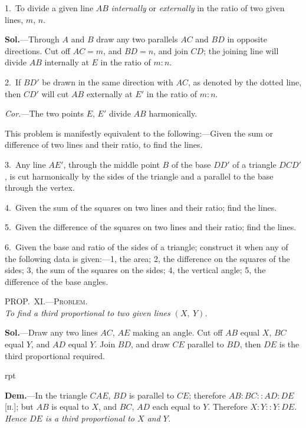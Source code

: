 \documentclass[oneside]{book}
\newcounter{wrapwidth}
\newcommand\myprop[2]{
\bigskip\Needspace*{4\baselineskip}\begin{center}\textsc{#1}\\\medskip\emph{#2}\par\end{center}
}
\newcommand\imgflow[3]{
\setcounter{wrapwidth}{#1}

\begin{wrapfigure}[#2]{r}{\value{wrapwidth}pt}
\begin{center}
\vspace{-0.3in}

\end{center}
\end{wrapfigure}
}
\newcommand\imgcent[2]{
\begin{center}

\end{center}
}
\begin{document}
\begin{footnotesize}
1.~To divide a given line $AB$ \emph{internally} or \emph{externally} in the
ratio of two given lines, $m$, $n$.



\imgcent{250}{f179}

\textbf{Sol.}---Through $A$ and $B$ draw any two parallels $AC$ and $BD$ in
opposite directions. Cut off $AC = m$, and $BD = n$, and join
$CD$; the joining line will divide $AB$ internally at $E$ in the ratio
of $m : n$.

2.~If $BD'$ be drawn in the same direction with $AC$, as denoted
by the dotted line, then $CD'$ will cut $AB$ externally at $E'$ in the
ratio of $m : n$.

\emph{Cor.}---The two points $E$, $E'$ divide $AB$ harmonically.

This problem is manifestly equivalent to the following:---Given
the sum or difference of two lines and their ratio, to find
the lines.

3.~Any line $AE'$, through the middle point $B$ of the base $DD'$
of a triangle $DCD'$, is cut harmonically by the sides of the
triangle and a parallel to the base through the vertex.

4.~Given the sum of the squares on two lines and their ratio;
find the lines.

5.~Given the difference of the squares on two lines and their
ratio; find the lines.

6.~Given the base and ratio of the sides of a triangle; construct
it when any of the following data is given:---1, the area;
2, the difference on the squares of the sides; 3, the sum of the
squares on the sides; 4, the vertical angle; 5, the difference of
the base angles.
\par\end{footnotesize}

\myprop{PROP\@.~XI\@.---Problem.}{To find a third proportional\index{Proportionals!third} to two given lines $(X,\ Y)$.}

\textbf{Sol.}---Draw any two lines $AC$, $AE$ making an angle.
Cut off $AB$ equal $X$, $BC$ equal $Y$, and $AD$ equal $Y$.
Join $BD$, and draw $CE$ parallel to $BD$, then $DE$ is the
third proportional required.




\imgflow{175}{7}{f180}

\textbf{Dem.}---In the triangle $CAE$, $BD$ is parallel to
$CE$; therefore $AB : BC
:: AD : DE$ [\textsc{ii.}]; but
$AB$ is equal to $X$, and
$BC$, $AD$ each equal to
$Y$. Therefore $X : Y
:: Y : DE$. \textit{Hence $DE$
is a third proportional to $X$ and $Y$.}
\end{document}
